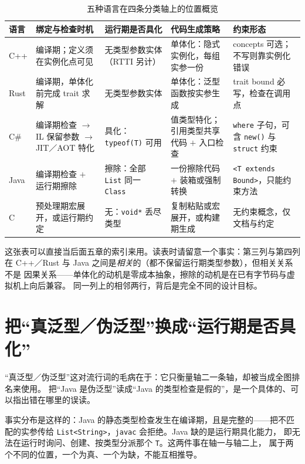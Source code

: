 \documentclass[12pt,a4paper,fontset=fandol]{ctexbook}
\newcommand{\cpp}[1]{C++#1}
\newcommand{\kw}[1]{\texttt{#1}}
\begin{document}
\begin{table}
\centering
\begin{tabular}{>{\raggedright\arraybackslash}p{}
                >{\raggedright\arraybackslash}p{}
                >{\raggedright\arraybackslash}p{}
                >{\raggedright\arraybackslash}p{}
                >{\raggedright\arraybackslash}p{}}
\toprule
语言 & 绑定与检查时机 & 运行期是否具化 & 代码生成策略 & 约束形态 \\
\midrule
\cpp{} & 编译期；定义须在实例化点可见 & 无类型参数实体（RTTI 另计） &
单体化：隐式实例化，每组实参一份 & concepts 可选；不写则靠实例化错误 \\
Rust & 编译期，单体化前完成 trait 求解 & 无类型参数实体 &
单体化：泛型函数按实参生成 & trait bound 必写，检查在调用点 \\
C\# & 编译期检查 $\rightarrow$ IL 保留参数 $\rightarrow$ JIT／AOT 特化 &
具化：\kw{typeof(T)} 可用 & 值类型特化；引用类型共享代码 $+$ 入口检查 &
\kw{where} 子句，可含 \kw{new()} 与 \kw{struct} 约束 \\
Java & 编译期检查 $+$ 运行期擦除 & 擦除：全部 \kw{List} 同一 \kw{Class} &
一份擦除代码 $+$ 装箱或强制转换 & \kw{<T extends Bound>}，只能约束方法 \\
C & 预处理期宏展开，或运行期约定 & 无：\kw{void*} 丢尽类型 &
复制粘贴或宏展开，或构建期生成 & 无约束概念，仅文档与约定 \\
\bottomrule
\end{tabular}
\caption{五种语言在四条分类轴上的位置概览}
\end{table}

这张表可以直接当后面五章的索引来用。读表时请留意一个事实：第三列与第四列在
\cpp{}／Rust 与 Java 之间是\emph{相关}的（都不保留运行期类型参数），但相关关系不是
因果关系——单体化的动机是零成本抽象，擦除的动机是在已有字节码与虚拟机上向后兼容。
同一列上的相邻两行，背后是完全不同的设计目标。

\section{把“真泛型／伪泛型”换成“运行期是否具化”}

“真泛型／伪泛型”这对流行词的毛病在于：它只衡量轴二一条轴，却被当成全图排名来使用。
把“Java 是伪泛型”读成“Java 的类型检查是假的”，是一个具体的、可以指出错在哪里的误读。

事实分布是这样的：Java 的静态类型检查发生在编译期，且是完整的——把不匹配的实参传给
\kw{List<String>}，\kw{javac} 会拒绝。Java 缺的是运行期具化能力，
即无法在运行时询问、创建、按类型分派那个 \kw{T}。这两件事在轴一与轴二上，
属于两个不同的位置，一个为真、一个为缺，不能互相推导。
\end{document}
